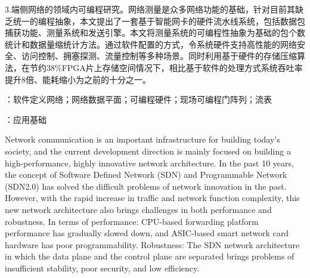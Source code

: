 3.端侧网络的领域内可编程研究。网络测量是众多网络功能的基础，针对目前其缺乏统一的编程抽象，本文提出了一套基于智能网卡的硬件流水线系统，包括数据包捕获功能、测量系统和发送引擎。本文将测量系统的可编程性抽象为基础的包个数统计和数据量缩统计方法。通过软件配置的方式，令系统硬件支持高性能的网络安全、访问控制、拥塞探测、流量控制等多种场景。同时利用基于硬件的存储压缩算法，在节约38\%FPGA片上存储空间情况下，相比基于软件的处理方式系统吞吐率提升8倍、能耗缩小为之前的十分之一。




{\boldsong}
\vspace{\baselineskip}
：软件定义网络；网络数据平面；可编程硬件；现场可编程门阵列；流表

\vspace{\baselineskip}
：应用基础


\clearpage


%

\noindent Network communication is an important infrastructure for building today's society, and the current development direction is mainly focused on building a high-performance, highly innovative network architecture. In the past 10 years, the concept of Software Defined Network (SDN) and Programmable Network (SDN2.0) has solved the difficult problems of network innovation in the past. However, with the rapid increase in traffic and network function complexity, this new network architecture also brings challenges in both performance and robustness. In terms of performance: CPU-based forwarding platform performance has gradually slowed down, and ASIC-based smart network card hardware has poor programmability. Robustness: The SDN network architecture in which the data plane and the control plane are separated brings problems of insufficient stability, poor security, and low efficiency.\newline

